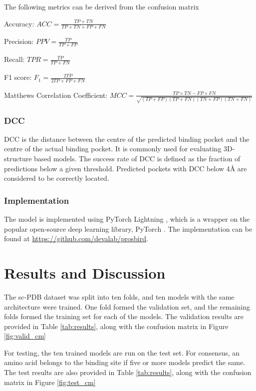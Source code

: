 \documentclass[journal=jacsat,manuscript=article]{achemso}
\begin{document}
\noindent The following metrics can be derived from the confusion matrix

Accuracy: ${ACC} = \frac{TP + TN}{TP + TN + FP + FN}$

Precision: ${PPV} = \frac{TP}{TP + FP}$

Recall: ${TPR} = \frac{TP}{TP + FN}$

F1 score: ${F_1} = \frac{2TP}{2TP + FP + FN}$

Matthews Correlation Coefficient: ${MCC} = \frac{TP \times TN - FP \times FN}{\sqrt{(TP + FP)(TP + FN)(TN + FP)(TN + FN)}}$

\subsubsection{DCC}
DCC is the distance between the centre of the predicted binding pocket and the centre of the actual binding pocket. It is commonly used for evaluating 3D-structure based models. The success rate of DCC is defined as the fraction of predictions below a given threshold. Predicted pockets with DCC below 4{\AA} are considered to be correctly located.

\subsubsection{Implementation}
\quad The model is implemented using PyTorch Lightning \cite{falcon2019pytorch}, which is a wrapper on the popular open-source deep learning library, PyTorch \cite{NEURIPS2019_9015}. The implementation can be found at \href{https://github.com/devalab/prosbird}{https://github.com/devalab/prosbird}.

\section{Results and Discussion}
\quad The sc-PDB dataset was split into ten folds, and ten models with the same architecture were trained. One fold formed the validation set, and the remaining folds
formed the training set for each of the models. The validation results are provided in Table \ref{tab:results}, along with the confusion matrix in Figure \ref{fig:valid_cm}

For testing, the ten trained models are run on the test set. For consensus, an amino acid belongs to the binding site if five or more models predict the same. The test results are also provided in Table \ref{tab:results}, along with the confusion matrix in Figure \ref{fig:test_cm}
\end{document}
